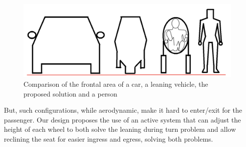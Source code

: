 \newpage 

\begin{figure}[h!]
    \centering
    \includegraphics[width=1\linewidth]{Figures/ch4_frontComparisonVehicle.png}
    \caption{Comparison of the frontal area of a car, a leaning vehicle, the proposed solution and a person}
    \label{fig:frontal_comparison}
\end{figure}

But, such configurations, while aerodynamic, make it hard to enter/exit for the passenger. Our design proposes the use of an active system that can adjust the height of each wheel to both solve the leaning during turn problem and allow reclining the seat for easier ingress and egress, solving both problems.

